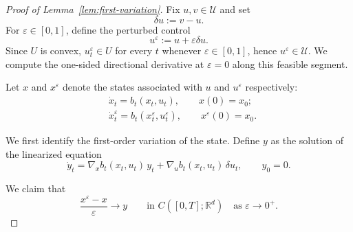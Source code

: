 \documentclass[10pt,a4paper]{amsart}
\begin{document}
\begin{proof}[Proof of Lemma~\ref{lem:first-variation}]
Fix $u,v\in\mathcal U$ and set
\[
\delta u := v-u.
\]
For $\varepsilon \in [0,1]$, define the perturbed control
\[
u^\varepsilon := u+\varepsilon \delta u.
\]
Since $U$ is convex, $u^\varepsilon_t\in U$ for every $t$ whenever $\varepsilon\in[0,1]$,
hence $u^\varepsilon\in\mathcal U$. We compute the one-sided directional derivative at $\varepsilon=0$ along this feasible segment.

Let $x$ and $x^\varepsilon$ denote the states associated with $u$ and $u^\varepsilon$ respectively:
\begin{align*}
& \dot x_t=b_t(x_t,u_t),
\qquad
x(0)=x_0; \\
& \dot x_t^\varepsilon=b_t(x_t^\varepsilon,u_t^\varepsilon),
\qquad
x^\varepsilon(0)=x_0.
\end{align*}

We first identify the first-order variation of the state.
Define $y$ as the solution of the linearized equation
\begin{equation}\label{eq:linearized-state}
\dot y_t
=
\nabla_x b_t(x_t,u_t)\,y_t+\nabla_u b_t(x_t,u_t)\,\delta u_t,
\qquad
y_0=0.
\end{equation}

We claim that
\begin{equation}\label{eq:state-diff-quotient}
\frac{x^\varepsilon-x}{\varepsilon}\to y
\qquad\text{in } C([0,T];\mathbb R^d)
\quad\text{as }\varepsilon\to 0^+.
\end{equation}


\end{proof}
\end{document}

